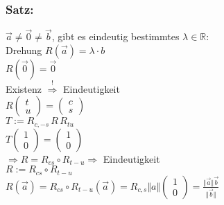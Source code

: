 \subsubsection{Satz:}
$\vec{a} \neq \vec{0} \neq \vec{b}$, gibt es eindeutig bestimmtes $\lambda \in \mathbb{R}:$\\
Drehung $ R(\vec{a})=\lambda \cdot b$\\
$R(\vec{0})=\vec{0}$\\
%
%
%
%
Existenz $\mathop{\Rightarrow}\limits^{\text{!}}$ Eindeutigkeit\\
$R\begin{pmatrix} t \\ u \end{pmatrix} = \begin{pmatrix} c \\ s \end{pmatrix}$\\
$T:= R_{c,-s} \, R \, R_{tu}$\\
$T\begin{pmatrix} 1 \\ 0 \end{pmatrix} = \begin{pmatrix} 1 \\ 0 \end{pmatrix}$\\
$\Rightarrow R = R_{cs} \circ R_{t-u} \Rightarrow$ Eindeutigkeit \\
$R:= R_{cs} \circ R_{t-u}$\\
$R(\vec{a}) = R_{cs} \circ R_{t-u} (\vec{a}) = R_{c,s} \Vert a \Vert \begin{pmatrix} 1 \\ 0 \end{pmatrix} = \frac{\Vert \vec{a}\Vert \vec{b}}{\Vert \vec{b} \Vert}$
%
%
%
